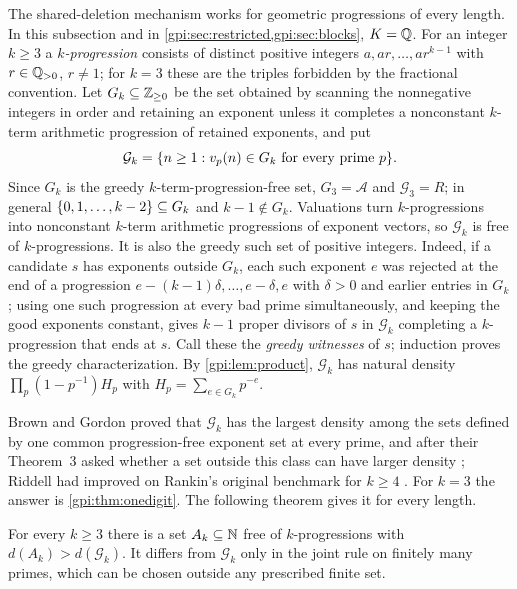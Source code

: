 The shared-deletion mechanism works for geometric progressions of every length. In this
subsection and in \cref{gpi:sec:restricted,gpi:sec:blocks}, $K=\mathbb{Q}$. For an integer $k\ge3$ a
\emph{$k$-progression} consists of distinct positive integers $a,ar,\dots,ar^{k-1}$ with
$r\in\mathbb{Q}_{>0}$, $r\ne1$; for $k=3$ these are the triples forbidden by the fractional convention.
Let $G_k\subseteq\mathbb{Z}_{\ge0}$ be the set obtained by scanning the nonnegative integers in order and
retaining an exponent unless it completes a nonconstant $k$-term arithmetic progression of
retained exponents, and put
\[
 \mathcal G_k=\{n\ge1:v_p(n)\in G_k\text{ for every prime }p\}.
\]
Since $G_k$ is the greedy $k$-term-progression-free set, $G_3=\mathcal A$ and $\mathcal G_3=R$; in
general $\{0,1,\dots,k-2\}\subseteq G_k$ and $k-1\notin G_k$. Valuations turn $k$-progressions
into nonconstant $k$-term arithmetic progressions of exponent vectors, so $\mathcal G_k$ is free of
$k$-progressions. It is also the greedy such set of positive integers. Indeed, if a candidate $s$
has exponents outside $G_k$, each such exponent $e$ was rejected at the end of a progression
$e-(k-1)\delta,\dots,e-\delta,e$ with $\delta>0$ and earlier entries in $G_k$; using one such
progression at every bad prime simultaneously, and keeping the good exponents constant, gives $k-1$
proper divisors of $s$ in $\mathcal G_k$ completing a $k$-progression that ends at $s$. Call these
the \emph{greedy witnesses} of $s$; induction proves the greedy characterization. By
\cref{gpi:lem:product}, $\mathcal G_k$ has natural density
$\prod_p(1-p^{-1})H_p$ with $H_p=\sum_{e\in G_k}p^{-e}$.

Brown and Gordon proved that $\mathcal G_k$ has the largest density among the sets defined by one
common progression-free exponent set at every prime, and after their Theorem~3 asked whether a set
outside this class can have larger density \cite{BrownGordon1996Sequences}; Riddell had improved on
Rankin's original benchmark for $k\ge4$ \cite{Riddell1969Sets}. For $k=3$ the answer is
\cref{gpi:thm:onedigit}. The following theorem gives it for every length.

\begin{theorem}\label{gpi:thm:klength}
For every $k\ge3$ there is a set $A_k\subseteq\mathbb{N}$ free of $k$-progressions with
$d(A_k)>d(\mathcal G_k)$. It differs from $\mathcal G_k$ only in the joint rule on finitely many
primes, which can be chosen outside any prescribed finite set.
\end{theorem}

